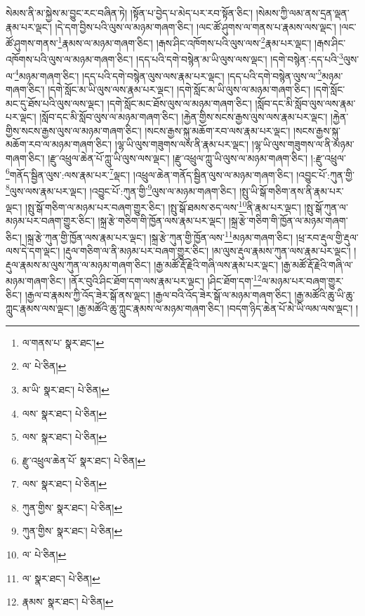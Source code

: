 སེམས་ནི་མ་སྐྱེས་མ་བྱུང་རང་བཞིན་ཏེ། །སྟོན་པ་བྱེད་པ་མེད་པར་རབ་སྟོན་ཅིང་། །སེམས་ཀྱི་ལམ་ནས་དྲན་ལྡན་རྣམ་པར་ལྡང་། །དེ་དག་བྱིས་པའི་ལུས་ལ་མཉམ་གཞག་ཅིང་། །ལང་ཚོ་ཤུགས་ལ་གནས་པ་རྣམས་ལས་ལྡང་། །ལང་ཚོ་ཤུགས་གནས་\footnote{ལ་གནས་པ་  སྣར་ཐང་། }རྣམས་ལ་མཉམ་གཞག་ཅིང་། །རྒས་ཤིང་འཁོགས་པའི་ལུས་ལས་\footnote{ལ་  པེ་ཅིན། }རྣམ་པར་ལྡང་། །རྒས་ཤིང་འཁོགས་པའི་ལུས་ལ་མཉམ་གཞག་ཅིང་། །དད་པའི་དགེ་བསྙེན་མ་ཡི་ལུས་ལས་ལྡང་། །དགེ་བསྙེན་:དད་པའི་\footnote{མ་ཡི་  སྣར་ཐང་།  པེ་ཅིན། }ལུས་ལ་\footnote{ལས་  སྣར་ཐང་།  པེ་ཅིན། }མཉམ་གཞག་ཅིང་། །དད་པའི་དགེ་བསྙེན་ལུས་ལས་རྣམ་པར་ལྡང་། །དད་པའི་དགེ་བསྙེན་ལུས་ལ་\footnote{ལས་  སྣར་ཐང་།  པེ་ཅིན། }མཉམ་གཞག་ཅིང་། །དགེ་སློང་མ་ཡི་ལུས་ལས་རྣམ་པར་ལྡང་། །དགེ་སློང་མ་ཡི་ལུས་ལ་མཉམ་གཞག་ཅིང་། །དགེ་སློང་མང་དུ་ཐོས་པའི་ལུས་ལས་ལྡང་། །དགེ་སློང་མང་ཐོས་ལུས་ལ་མཉམ་གཞག་ཅིང་། །སློབ་དང་མི་སློབ་ལུས་ལས་རྣམ་པར་ལྡང་། །སློབ་དང་མི་སློབ་ལུས་ལ་མཉམ་གཞག་ཅིང་། །རྐྱེན་གྱིས་སངས་རྒྱས་ལུས་ལས་རྣམ་པར་ལྡང་། །རྐྱེན་གྱིས་སངས་རྒྱས་ལུས་ལ་མཉམ་གཞག་ཅིང་། །སངས་རྒྱས་སྐུ་མཆོག་རབ་ལས་རྣམ་པར་ལྡང་། །སངས་རྒྱས་སྐུ་མཆོག་རབ་ལ་མཉམ་གཞག་ཅིང་། །ལྷ་ཡི་ལུས་གཟུགས་ལས་ནི་རྣམ་པར་ལྡང་། །ལྷ་ཡི་ལུས་གཟུགས་ལ་ནི་མཉམ་གཞག་ཅིང་། །རྫུ་འཕྲུལ་ཆེན་པོ་ཀླུ་ཡི་ལུས་ལས་ལྡང་། །རྫུ་འཕྲུལ་ཀླུ་ཡི་ལུས་ལ་མཉམ་གཞག་ཅིང་། །:རྫུ་འཕྲུལ་\footnote{རྫུ་འཕྲུལ་ཆེན་པོ་  སྣར་ཐང་།  པེ་ཅིན། }གནོད་སྦྱིན་ལུས་:ལས་རྣམ་པར་\footnote{ལས་  སྣར་ཐང་།  པེ་ཅིན། }ལྡང་། །འཕྲུལ་ཆེན་གནོད་སྦྱིན་ལུས་ལ་མཉམ་གཞག་ཅིང་། །འབྱུང་པོ་:ཀུན་གྱི་\footnote{ཀུན་གྱིས་  སྣར་ཐང་།  པེ་ཅིན། }ལུས་ལས་རྣམ་པར་ལྡང་། །འབྱུང་པོ་:ཀུན་གྱི་\footnote{ཀུན་གྱིས་  སྣར་ཐང་།  པེ་ཅིན། }ལུས་ལ་མཉམ་གཞག་ཅིང་། །སྤུ་ཡི་སྒོ་གཅིག་ནས་ནི་རྣམ་པར་ལྡང་། །སྤུ་སྒོ་གཅིག་ལ་མཉམ་པར་བཞག་གྱུར་ཅིང་། །སྤུ་སྒོ་ཐམས་ཅད་ལས་\footnote{ལ་  པེ་ཅིན། }ནི་རྣམ་པར་ལྡང་། །སྤུ་སྒོ་ཀུན་ལ་མཉམ་པར་བཞག་གྱུར་ཅིང་། །སྐྲ་རྩེ་གཅིག་གི་ཁྱོན་ལས་རྣམ་པར་ལྡང་། །སྐྲ་རྩེ་གཅིག་གི་ཁྱོན་ལ་མཉམ་གཞག་ཅིང་། །སྐྲ་རྩེ་ཀུན་གྱི་ཁྱོན་ལས་རྣམ་པར་ལྡང་། །སྐྲ་རྩེ་ཀུན་གྱི་ཁྱོན་ལས་\footnote{ལ་  སྣར་ཐང་།  པེ་ཅིན། }མཉམ་གཞག་ཅིང་། །ཕྲ་རབ་རྡུལ་གྱི་རྡུལ་ལས་དེ་དག་ལྡང་། །རྡུལ་གཅིག་ལ་ནི་མཉམ་པར་བཞག་གྱུར་ཅིང་། །མ་ལུས་རྡུལ་རྣམས་ཀུན་ལས་རྣམ་པར་ལྡང་། །རྡུལ་རྣམས་མ་ལུས་ཀུན་ལ་མཉམ་གཞག་ཅིང་། །རྒྱ་མཚོ་རྡོ་རྗེའི་གཞི་ལས་རྣམ་པར་ལྡང་། །རྒྱ་མཚོ་རྡོ་རྗེའི་གཞི་ལ་མཉམ་གཞག་ཅིང་། །ནོར་བུའི་ཤིང་ཐོག་དག་ལས་རྣམ་པར་ལྡང་། །ཤིང་ཐོག་དག་\footnote{རྣམས་  སྣར་ཐང་།  པེ་ཅིན། }ལ་མཉམ་པར་བཞག་གྱུར་ཅིང་། །རྒྱལ་བ་རྣམས་ཀྱི་འོད་ཟེར་སྒོ་ནས་ལྡང་། །རྒྱལ་བའི་འོད་ཟེར་སྒོ་ལ་མཉམ་གཞག་ཅིང་། །རྒྱ་མཚོའི་ཆུ་ཡི་ཆུ་ཀླུང་རྣམས་ལས་ལྡང་། །རྒྱ་མཚོའི་ཆུ་ཀླུང་རྣམས་ལ་མཉམ་གཞག་ཅིང་། །བདག་ཉིད་ཆེན་པོ་མེ་ཡི་ལམ་ལས་ལྡང་། །
